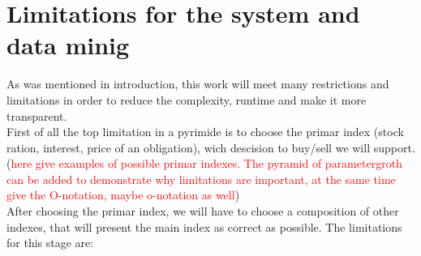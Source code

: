 \documentclass[11pt]{article}
\begin{document}
\section{Limitations for the system and data minig}
As was mentioned in introduction, this work will meet many restrictions and limitations in order to reduce the complexity, runtime and make it more transparent. \\
First of all the top limitation in a pyrimide is to choose the primar index (stock ration, interest, price of an  obligation), wich descision to buy/sell we will support. (\textcolor{red}{here give examples of possible primar indexes. The pyramid of parametergroth can be added to demonstrate why limitations are important, at the same time give the O-notation, maybe o-notation as well})\\
After choosing the primar index, we will have to choose a composition of other indexes, that will present the main index as correct as possible. The limitations for this stage are:
\end{document}
